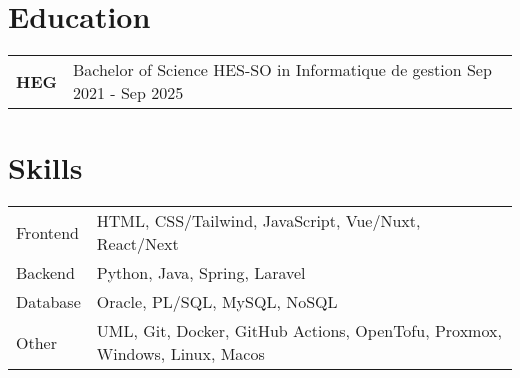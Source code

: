 \documentclass[a4paper,12pt]{article}
\begin{document}
\section{Education}
\begin{tabularx}{\linewidth}{@{}l X@{}}	
\textbf{HEG} & Bachelor of Science HES-SO in Informatique de gestion \hfill \normalsize Sep 2021 - Sep 2025\\

\end{tabularx}


\section{Skills}
\begin{tabularx}{\linewidth}{@{}l X@{}}
Frontend &  \normalsize{HTML, CSS/Tailwind, JavaScript, Vue/Nuxt, React/Next}\\
Backend  &  \normalsize{Python, Java, Spring, Laravel}\\
Database &  \normalsize{Oracle, PL/SQL, MySQL, NoSQL}\\
Other   &  \normalsize{UML, Git, Docker, GitHub Actions, OpenTofu, Proxmox, Windows, Linux, Macos}\\
\end{tabularx}

\vfill
{}
\end{document}

